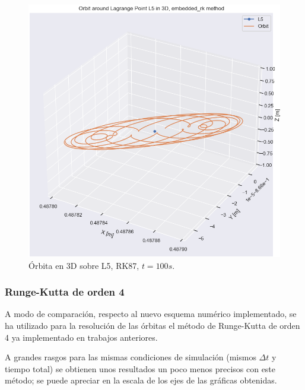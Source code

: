 \documentclass[12pt,a4paper]{article}
\begin{document}
\begin{figure}[H]
	\centering
	\includegraphics[width=\x\textwidth]{FIGURES/mil6/L5_orbit_erk_t100.png}
	\caption{Órbita en 3D sobre L5, RK87, $t = 100 s$.}
	\label{L5_orbit_erk_t100}
\end{figure}


\subsubsection{Runge-Kutta de orden 4}
A modo de comparación, respecto al nuevo esquema numérico implementado, se ha utilizado para la resolución de las órbitas el método de Runge-Kutta de orden 4 ya implementado en trabajos anteriores. 

A grandes rasgos para las mismas condiciones de simulación (mismos $\Delta t$ y tiempo total) se obtienen unos resultados un poco menos precisos con este método; se puede apreciar en la escala de los ejes de las gráficas obtenidas. 
\end{document}
